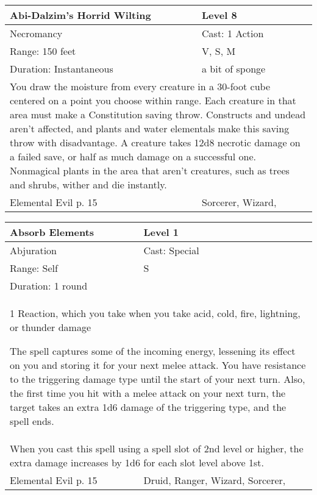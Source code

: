 \documentclass[11pt]{report}
\begin{document}
\begin{table}[H]
	\begin{tabular}{||p{6cm}|p{6cm}||}
		\hline\hline
		\bf{Abi-Dalzim’s Horrid Wilting} & Level 8\\ \hline
		Necromancy & Cast: 1 Action\\ \hline
		Range: 150 feet & V, S, M\\ \hline
		Duration: Instantaneous & a bit of sponge\\ \hline
		\multicolumn{2}{||p{12cm}||}{You draw the moisture from every creature in a 30-foot cube centered on a point you choose within range. Each creature in that area must make a Constitution saving throw. Constructs and undead aren’t affected, and plants and water elementals make this saving throw with disadvantage. A creature takes 12d8 necrotic damage on a failed save, or half as much damage on a successful one. 
Nonmagical plants in the area that aren’t creatures, such as trees and shrubs, wither and die instantly.}\\ \hline
Elemental Evil p. 15 & Sorcerer, Wizard, \\ \hline\hline
	\end{tabular}
\end{table}

\begin{table}[H]
	\begin{tabular}{||p{6cm}|p{6cm}||}
		\hline\hline
		\bf{Absorb Elements } & Level 1\\ \hline
		Abjuration & Cast: Special\\ \hline
		Range: Self & S\\ \hline
		Duration: 1 round & \\ \hline
		\multicolumn{2}{||p{12cm}||}{1 Reaction, which you take when you take acid, cold, fire, lightning, or thunder damage

The spell captures some of the incoming energy, lessening its effect on you and storing it for your next melee attack. You have resistance to the triggering damage type until the start of your next turn. Also, the first time you hit with a melee attack on your next turn, the target takes an extra 1d6 damage of the triggering type, and the spell ends.}\\ \hline
		\multicolumn{2}{||p{12cm}||}{When you cast this spell using a spell slot of 2nd level or higher, the extra damage increases by 1d6 for each slot level above 1st.}\\ \hline
Elemental Evil p. 15 & Druid, Ranger, Wizard, Sorcerer, \\ \hline\hline
	\end{tabular}
\end{table}
\end{document}

